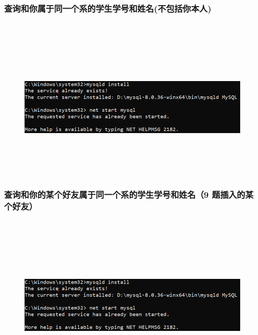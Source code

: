 \documentclass{ctexart}
\begin{document}
\subsubsection{查询和你属于同一个系的学生学号和姓名(不包括你本人)}
\begin{lstlisting}[language=sql]
	
\end{lstlisting}
\begin{figure}[H]
	\centering 
	\includegraphics[height=7cm,width=14cm]{1.png}
	\end{figure}
\subsubsection{查询和你的某个好友属于同一个系的学生学号和姓名（9 题插入的某个好友）}
\begin{lstlisting}[language=sql]
	
\end{lstlisting}
\begin{figure}[H]
	\centering 
	\includegraphics[height=7cm,width=14cm]{1.png}
	\end{figure}
\end{document}

